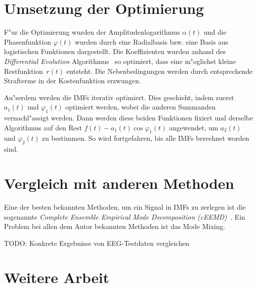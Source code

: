 \documentclass[a4paper]{scrartcl}
\newcommand{\pphi}{{\varphi}}
\newcommand{\todo}[1]{{TODO: {#1}}}
\begin{document}
\section{Umsetzung der Optimierung}

F"ur die Optimierung wurden der Amplitudenlogarithmus $\alpha(t)$ und die Phasenfunktion $\pphi(t)$ wurden durch eine Radialbasis bzw. eine Basis aus logistischen Funktionen dargestellt. 
Die Koeffizienten wurden anhand des {\em Differential Evolution} Algorithmus~\citep*{StPr1997} so optimiert, dass eine m"oglichst kleine Restfunktion~$r(t)$ entsteht. 
Die Nebenbedingungen werden durch entsprechende Strafterme in der Kostenfunktion erzwungen. 

Au"serdem werden die IMFs iterativ optimiert. 
Dies geschieht, indem zuerst $a_1(t)$ und $\pphi_1(t)$ optimiert werden, wobei die anderen Summanden vernachl"assigt werden. 
Dann werden diese beiden Funktionen fixiert und derselbe Algorithmus auf den Rest $f(t) - a_1(t)\cos\pphi_1(t)$ angewendet, um $a_2(t)$ und $\pphi_2(t)$ zu bestimmen. 
So wird fortgefahren, bis alle IMFs berechnet worden sind. 

\section{Vergleich mit anderen Methoden}

Eine der besten bekannten Methoden, um ein Signal in IMFs zu zerlegen ist die sogenannte {\em Complete Ensemble Empirical Mode Decomposition (cEEMD)}~\citep*{TCSF2011}.
Ein Problem bei allen dem Autor bekannten Methoden ist das Mode Mixing. 

\todo{Konkrete Ergebnisse von EEG-Testdaten vergleichen}


\section{Weitere Arbeit} 
\end{document}

